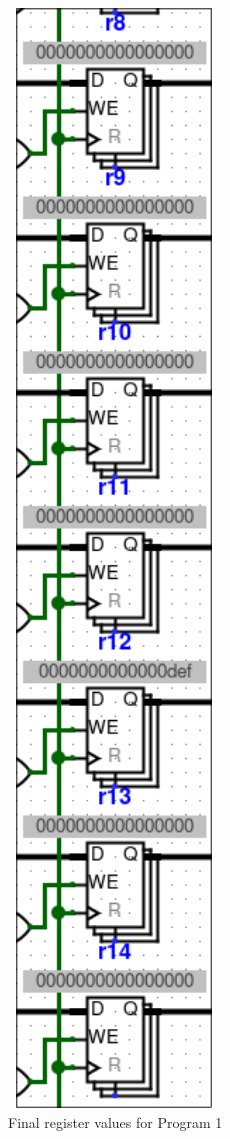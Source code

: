 \documentclass{article}
\begin{document}
\begin{minipage}{0.5\textwidth}
    \begin{figure}[H]
        \centering
        \includegraphics[width=0.5\textwidth]{./images/test1_reg2.png}
        \caption{Final register values for Program 1}
    \end{figure}
\end{minipage}
\end{document}
